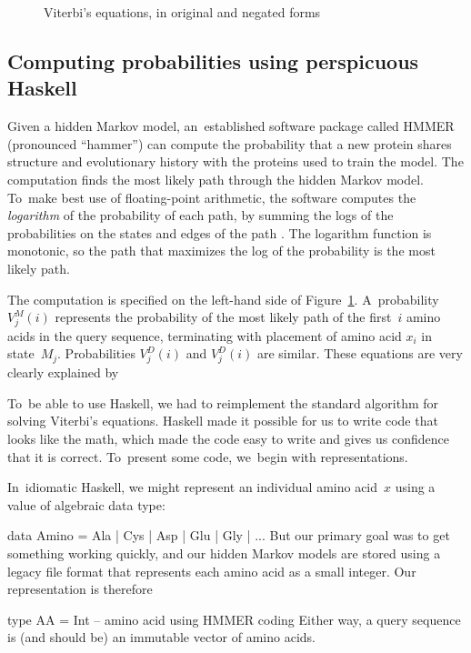 \documentclass[nonatbib]{sigplanconf}
\newcommand\figref[1]{Figure~\ref{#1}}
\newcommand\seclabel[1]{\label{sec:#1}}
\newenvironment{smallverbatim}{\par\small\verbatim}{\endverbatim}
\let\cite\citep
\begin{document}
\begin{figure}
\caption{Viterbi's equations, in original and negated forms}
\label{viterbi}
\end{figure}



\subsection{Computing probabilities using perspicuous Haskell}

\seclabel{viterbi}


Given a hidden Markov model, 
an~established software package called HMMER (pronounced ``hammer'') 
can compute the probability
that a new protein shares structure and
evolutionary history with the proteins used to train the model.
The computation finds the most likely path through the hidden Markov model.
To~make best use of floating-point arithmetic, the software computes
the \emph{logarithm} of the probability of each path, by summing
the logs of the 
probabilities on the states and edges of the path \cite{Viterbi:1967hq}.
The logarithm function is monotonic, so the path that maximizes the
log of the probability is the most likely path.

The computation is specified on the left-hand side of \figref{viterbi}.
A~probability $V_j^M(i)$ represents the probability of the most
likely path of the first~$i$ amino acids in the query sequence,
terminating with placement of amino acid $x_i$ in state~$M_j$.
Probabilities $V_j^D(i)$ and $V_j^D(i)$ are similar.
These
equations are very clearly explained by
\citet[Chapter~5]{Durbin:1998wz}


To~be able to use Haskell, we had to reimplement the standard
algorithm for solving Viterbi's equations.
Haskell made it possible for us to write code that looks like the
math,
which made the code easy to write and gives us confidence that it is
correct.
To~present some code,
we~begin with representations.

In~idiomatic Haskell, 
we might represent an individual amino acid~$x$
using a value of algebraic data type:
\begin{smallverbatim}
data Amino = Ala | Cys | Asp | Glu | Gly | ...
\end{smallverbatim}
But our primary goal was to get something working quickly,
and our hidden Markov models are stored using a
legacy file format that represents each amino acid as a small integer.
Our representation is therefore
\begin{smallverbatim}
type AA = Int -- amino acid using HMMER coding
\end{smallverbatim}
Either way, a query sequence is (and should be) an immutable vector of
amino acids.
\end{document}
